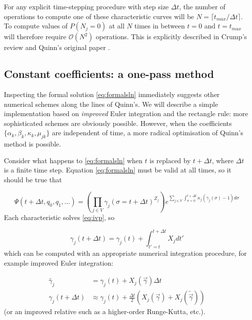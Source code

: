\documentclass{article}
\begin{document}
For any explicit time-stepping procedure with step size $\Delta t$, the number
of operations to compute one of these characteristic curves will be $N = \lceil
t_{max} / \Delta t \rceil$. To compute values of $P(N_j = 0)$ at all $N$ times
in between $t=0$ and $t=t_{max}$ will therefore require $\mathcal{O}(N^2)$
operations. This is explicitly described in Crump's review and Quinn's original
paper \cite{crump2005numerical,quinn1989calculating}.

\subsection{Constant coefficients: a one-pass method}
\label{sec:flying}

Inspecting the formal solution \eqref{eq:formalsln} immediately
suggests other numerical schemes along the lines of Quinn's. We will describe a simple
implementation based on \emph{improved} Euler integration and the rectangle rule: more
sophisticated schemes are obviously possible.
However, when the coefficients $\{\alpha_k, \beta_k, \kappa_k, \mu_{jk}\}$ are
independent of time, a more radical optimisation of Quinn's method is possible.

Consider what happens to \eqref{eq:formalsln} when $t$ is replaced by $t +
\Delta t$, where $\Delta t$ is a finite time step. Equation \eqref{eq:formalsln}
must be valid at all times, so it should be true that

\begin{equation}
    \Psi(t + \Delta t,q_0,q_1,\dots) = \left(\prod_{j \in V}
    \gamma_j(\sigma=t + \Delta t)^{Z_j}\right)
    e^{\sum_{j \in V} \int_{\sigma=0}^{t + \Delta t} \kappa_j (\gamma_j(\sigma)-1) d\sigma}
\end{equation}
Each characteristic solves \eqref{eq:ivp}, so

\begin{equation}
    \gamma_j(t+\Delta t) = \gamma_j(t) + \int_{t'=t}^{t+\Delta t} X_j dt'
\end{equation}
which can be computed with an appropriate numerical integration procedure, for
example improved Euler integration:

\begin{align}
    \tilde{\gamma_j} &= \gamma_j(t) + X_j(\vec{\gamma}) \Delta t \nonumber \\
    \gamma_j(t+\Delta t) &\approx \gamma_j(t) + \frac{\Delta t}{2}
    (X_j(\vec{\gamma}) + X_j(\tilde{\vec{\gamma}}))
\end{align}
(or an improved relative such as a higher-order Runge-Kutta, etc.).
\end{document}
